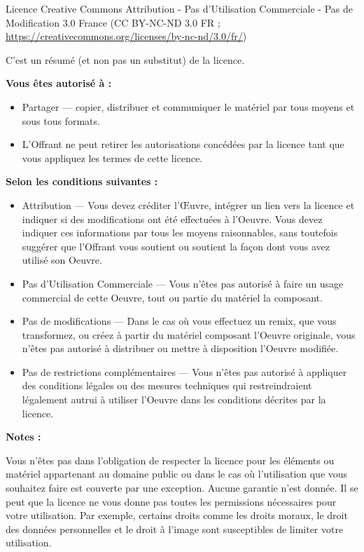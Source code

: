 \documentclass[
]{book}
\providecommand{\tightlist}{%
  \setlength{\itemsep}{0pt}\setlength{\parskip}{0pt}}
\begin{document}
Licence Creative Commons Attribution - Pas d'Utilisation Commerciale - Pas de Modification 3.0 France (CC BY-NC-ND 3.0 FR ; \url{https://creativecommons.org/licenses/by-nc-nd/3.0/fr/})

C'est un résumé (et non pas un substitut) de la licence.

\textbf{Vous êtes autorisé à :}

\begin{itemize}
\tightlist
\item
  Partager --- copier, distribuer et communiquer le matériel par tous moyens et sous tous formats.
\item
  L'Offrant ne peut retirer les autorisations concédées par la licence tant que vous appliquez les termes de cette licence.
\end{itemize}

\textbf{Selon les conditions suivantes :}

\begin{itemize}
\item
  Attribution --- Vous devez créditer l'Œuvre, intégrer un lien vers la licence et indiquer si des modifications ont été effectuées à l'Oeuvre. Vous devez indiquer ces informations par tous les moyens raisonnables, sans toutefois suggérer que l'Offrant vous soutient ou soutient la façon dont vous avez utilisé son Oeuvre.
\item
  Pas d'Utilisation Commerciale --- Vous n'êtes pas autorisé à faire un usage commercial de cette Oeuvre, tout ou partie du matériel la composant.
\item
  Pas de modifications --- Dans le cas où vous effectuez un remix, que vous transformez, ou créez à partir du matériel composant l'Oeuvre originale, vous n'êtes pas autorisé à distribuer ou mettre à disposition l'Oeuvre modifiée.
\item
  Pas de restrictions complémentaires --- Vous n'êtes pas autorisé à appliquer des conditions légales ou des mesures techniques qui restreindraient légalement autrui à utiliser l'Oeuvre dans les conditions décrites par la licence.
\end{itemize}

\textbf{Notes :}

Vous n'êtes pas dans l'obligation de respecter la licence pour les éléments ou matériel appartenant au domaine public ou dans le cas où l'utilisation que vous souhaitez faire est couverte par une exception.
Aucune garantie n'est donnée. Il se peut que la licence ne vous donne pas toutes les permissions nécessaires pour votre utilisation. Par exemple, certains droits comme les droits moraux, le droit des données personnelles et le droit à l'image sont susceptibles de limiter votre utilisation.
\end{document}
